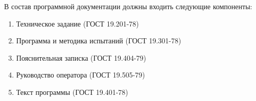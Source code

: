В состав программной документации должны входить следующие компоненты:
\begin{enumerate}
    \item Техническое задание (ГОСТ 19.201-78)
    \item Программа и методика испытаний (ГОСТ 19.301-78)
    \item Пояснительная записка (ГОСТ 19.404-79)
    \item Руководство оператора (ГОСТ 19.505-79)
    \item Текст программы (ГОСТ 19.401-78)
\end{enumerate}

